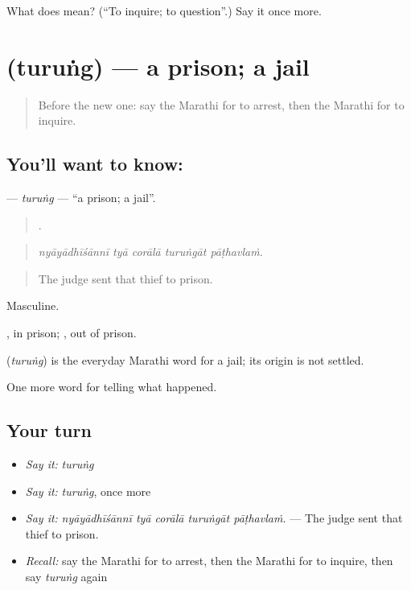 \begin{tcolorbox}[breakable,colback=teal!4,colframe=teal!35!black,title={Before you move on}]
What does   mean? (\textquotedblleft{}To inquire; to question\textquotedblright{}.) Say it once more.
\end{tcolorbox}
\section[\texorpdfstring{\mr{तुरुंग} (turuṅg)}{तुरुंग (turuṅg)}]{ (turuṅg) — a prison; a jail}

\label{lesson:MR-C290-turung}



\begin{quote}
Before the new one: say the Marathi for to arrest, then the Marathi for to inquire.
\end{quote}

\subsection*{You'll want to know: }
\textbf{} — \emph{turuṅg} — \textquotedblleft{}a prison; a jail\textquotedblright{}.

\begin{quote}
    .
\end{quote}

\begin{quote}
\emph{nyāyādhīśānnī tyā corālā turuṅgāt pāṭhavlaṁ.}
\end{quote}

\begin{quote}
The judge sent that thief to prison.
\end{quote}

Masculine.

, in prison; , out of prison.

\begin{cousinweb}
\textbf{} (\emph{turuṅg}) is the everyday Marathi word for a jail; its origin is not settled.
\end{cousinweb}

\begin{grammarlens}[title={What you've built}]
One more word for telling what happened.
\end{grammarlens}

\subsection*{Your turn}
\begin{itemize}
\raggedright
  \item \emph{Say it:} \emph{turuṅg}
  \item \emph{Say it:} \emph{turuṅg}, once more
  \item \emph{Say it:} \emph{nyāyādhīśānnī tyā corālā turuṅgāt pāṭhavlaṁ.} — The judge sent that thief to prison.
  \item \emph{Recall:} say the Marathi for to arrest, then the Marathi for to inquire, then say \emph{turuṅg} again
\end{itemize}

